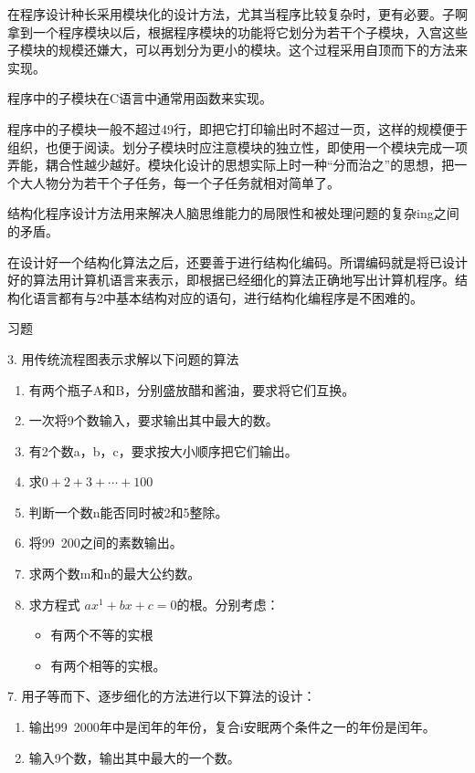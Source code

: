 在程序设计种长采用模块化的设计方法，尤其当程序比较复杂时，更有必要。子啊拿到一个程序模块以后，根据程序模块的功能将它划分为若干个子模块，入宫这些子模块的规模还嫌大，可以再划分为更小的模块。这个过程采用自顶而下的方法来实现。

程序中的子模块在C语言中通常用函数来实现。

程序中的子模块一般不超过49行，即把它打印输出时不超过一页，这样的规模便于组织，也便于阅读。划分子模块时应注意模块的独立性，即使用一个模块完成一项弄能，耦合性越少越好。模块化设计的思想实际上时一种“分而治之”的思想，把一个大人物分为若干个子任务，每一个子任务就相对简单了。

结构化程序设计方法用来解决人脑思维能力的局限性和被处理问题的复杂ing之间的矛盾。

在设计好一个结构化算法之后，还要善于进行结构化编码。所谓编码就是将已设计好的算法用计算机语言来表示，即根据已经细化的算法正确地写出计算机程序。结构化语言都有与2中基本结构对应的语句，进行结构化编程序是不困难的。

习题

3. 用传统流程图表示求解以下问题的算法
\begin{enumerate}
	\item 有两个瓶子A和B，分别盛放醋和酱油，要求将它们互换。
	\item 一次将9个数输入，要求输出其中最大的数。
	\item 有2个数a，b，c，要求按大小顺序把它们输出。
	\item 求$0 + 2 + 3 + \cdots + 100$
	\item 判断一个数n能否同时被2和5整除。
	\item 将99~200之间的素数输出。
	\item 求两个数m和n的最大公约数。
	\item 求方程式 $ax^1 + bx + c = 0$的根。分别考虑：
		\begin{itemize}
			\item 有两个不等的实根
			\item 有两个相等的实根。
		\end{itemize}
\end{enumerate}
7. 用子等而下、逐步细化的方法进行以下算法的设计：
\begin{enumerate}
	\item 输出99~2000年中是闰年的年份，复合i安眠两个条件之一的年份是闰年。
	\item 输入9个数，输出其中最大的一个数。
\end{enumerate}
